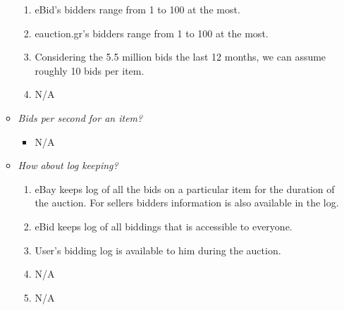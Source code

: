\documentclass[letterpaper,twocolumn,10pt]{article}
\begin{document}
\begin{itemize}
\begin{itemize}
\begin{enumerate}
    \item eBid's bidders range from 1 to 100 at the most.
    \item eauction.gr's bidders range from 1 to 100 at the most.
    \item Considering the 5.5 million bids the last 12 months, we can assume roughly 10 bids per item.
    \item N/A
    \end{enumerate}  
\item \emph{Bids per second for an item?}
    \begin{itemize}
    \item N/A
    \end{itemize}
\item \emph{How about log keeping?}
    \begin{enumerate}
    \item eBay keeps log of all the bids on a particular item for the duration of the auction. For sellers bidders information is also available in the log.
    \item eBid keeps log of all biddings that is accessible to everyone.
    \item User's bidding log is available to him during the auction. 
    \item N/A
    \item N/A
    \end{enumerate}
\end{itemize}
\end{itemize}

{\footnotesize 
}


\theendnotes
\end{document}
